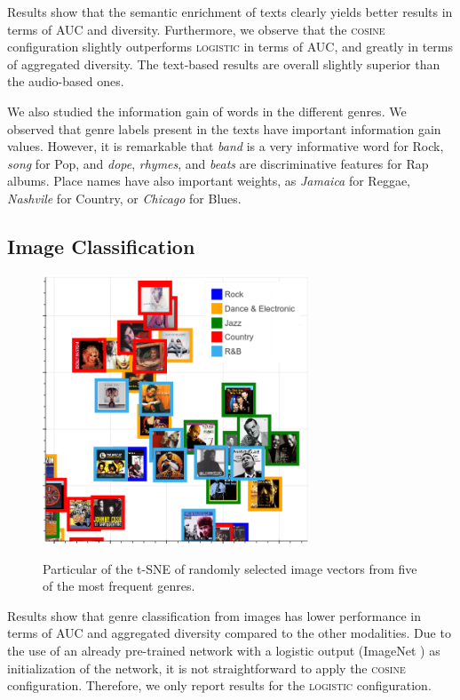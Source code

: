 Results show that the semantic enrichment of texts clearly yields better results in terms of AUC and diversity.
Furthermore, we observe that the \textsc{cosine} configuration slightly outperforms \textsc{logistic} in terms of AUC, and greatly in terms of aggregated diversity. 
The text-based results are overall slightly superior than the audio-based ones. 

We also studied the information gain of words in the different genres. We observed that genre labels present in the texts have important information gain values. However, it is remarkable that \textit{band} is a very informative word for Rock, \textit{song} for Pop, and \textit{dope}, \textit{rhymes}, and \textit{beats} are discriminative features for Rap albums. Place names have also important weights, as \textit{Jamaica} for Reggae, \textit{Nashvile} for Country, or \textit{Chicago} for Blues.%


\subsection{Image Classification}\label{sec:multi-class:imageexp}


\begin{figure}
\centering
\includegraphics[height=8cm,keepaspectratio]{ch09_multi-class_pics/visual_zoom2.png} \\ 
\caption{Particular of the t-SNE of randomly selected image vectors from five of the most frequent genres.}
\label{fig:tsne_visual}
\end{figure}

Results show that genre classification from images has lower performance in terms of AUC and aggregated diversity compared to the other modalities. Due to the use of an already pre-trained network with a logistic output (ImageNet \cite{ILSVRC15}) as initialization of the network, it is not straightforward to apply the \textsc{cosine} configuration. Therefore, we only report results for the \textsc{logistic} configuration.

